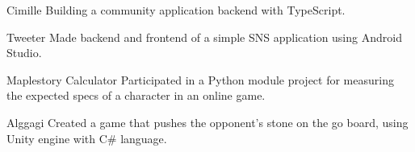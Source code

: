 

\begin{cvskills}

  \cvskill
    {Cimille} %
    {Building a community application backend with TypeScript.} %

  \cvskill
    {Tweeter} %
    {Made backend and frontend of a simple SNS application using Android Studio.} %

  \cvskill
    {Maplestory Calculator} %
    {Participated in a Python module project for measuring the expected specs of a character in an online game.} %

  \cvskill
    {Alggagi} %
    {Created a game that pushes the opponent's stone on the go board, using Unity engine with C\# language.} %

\end{cvskills}
